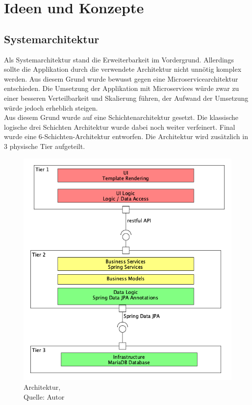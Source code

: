 \section{Ideen und Konzepte}
\subsection{Systemarchitektur}
Als Systemarchitektur stand die Erweiterbarkeit im Vordergrund. Allerdings sollte die Applikation durch die verwendete Architektur nicht unnötig komplex werden. Aus diesem Grund wurde bewusst gegen eine Microservicearchitektur entschieden. Die Umsetzung der Applikation mit Microservices würde zwar zu einer besseren Verteilbarkeit und Skalierung führen, der Aufwand der Umsetzung würde jedoch erheblich steigen. \\
Aus diesem Grund wurde auf eine Schichtenarchitektur gesetzt. Die klassische logische drei Schichten Architektur wurde dabei noch weiter verfeinert. Final wurde eine 6-Schichten-Architektur entworfen. Die Architektur wird zusätzlich in 3 physische Tier aufgeteilt. 

\begin{figure}[H]
	\centering
	\includegraphics[width=1\textwidth]{images/architecture.png}
	\caption[Architektur]{Architektur,\\ Quelle: Autor}
	\label{img: Architektur}
\end{figure}

